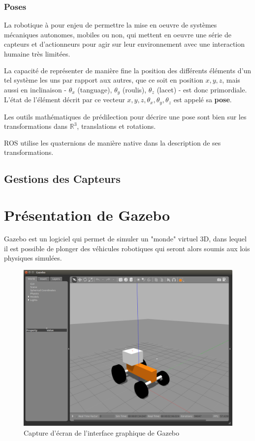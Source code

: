\documentclass[12pt,a4paper]{report}
\begin{document}
			\subsubsection{Poses}
		
		La robotique à pour enjeu de permettre la mise en oeuvre de systèmes mécaniques autonomes, mobiles ou non, qui mettent en oeuvre une série de capteurs et d'actionneurs pour agir sur leur environnement avec une interaction humaine très limitées.
		
		\para La capacité de représenter de manière fine la position des différents éléments d'un tel système les uns par rapport aux autres, que ce soit en position $x,y,z$, mais aussi en inclinaison - $\theta_x$ (tanguage), $\theta_y$ (roulis), $\theta_z$ (lacet) - est donc primordiale. L'état de l'élément décrit par ce vecteur $x,y,z, \theta_x, \theta_y, \theta_z$ est appelé sa \textbf{pose}.
		
		
		\para Les outils mathématiques de prédilection pour décrire une pose sont bien sur les transformations dans $\mathbb{R}^3$, translations et rotations. 
		
		
		\para ROS utilise les quaternions de manière native dans la description de ses transformations. 
		
		
		
		\subsection{Gestions des Capteurs}
		
		\newpage
	\section{Présentation de Gazebo}
	
	Gazebo est un logiciel qui permet de simuler un "monde" virtuel 3D, dans lequel il est possible de plonger des véhicules robotiques qui seront alors soumis aux lois physiques simulées.
		
	\begin{figure}[h!]
		\centering
		\includegraphics[width=0.7\linewidth]{img/gazebo}
		\caption[gazebo]{Capture d'écran de l'interface graphique de Gazebo}
		\label{fig:gazebo}
	\end{figure}
	
\end{document}
